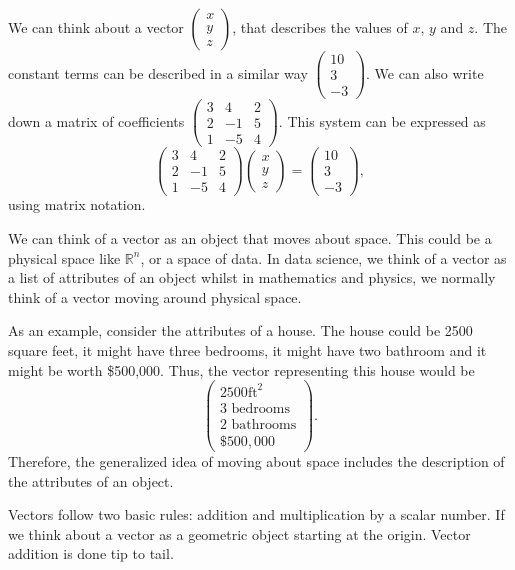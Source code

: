 \documentclass[
]{book}
\theoremstyle{definition}
\theoremstyle{definition}
\theoremstyle{definition}
\theoremstyle{definition}
\theoremstyle{remark}
\begin{document}
We can think about a vector \(\begin{pmatrix}x \\ y \\ z \end{pmatrix}\), that describes the values of \(x\), \(y\) and \(z\). The constant terms can be described in a similar way \(\begin{pmatrix}10 \\ 3 \\ -3 \end{pmatrix}\). We can also write down a matrix of coefficients \(\begin{pmatrix}3 & 4 & 2\\ 2 & -1 & 5\\ 1 & -5 & 4 \end{pmatrix}\). This system can be expressed as \[\begin{pmatrix}3 & 4 & 2\\ 2 & -1 & 5\\ 1 & -5 & 4 \end{pmatrix} \begin{pmatrix}x \\ y \\ z \end{pmatrix} = \begin{pmatrix}10 \\ 3 \\ -3 \end{pmatrix},\] using matrix notation.

We can think of a vector as an object that moves about space. This could be a physical space like \(\mathbb{R}^n\), or a space of data. In data science, we think of a vector as a list of attributes of an object whilst in mathematics and physics, we normally think of a vector moving around physical space.

As an example, consider the attributes of a house. The house could be 2500 square feet, it might have three bedrooms, it might have two bathroom and it might be worth \$500,000. Thus, the vector representing this house would be \[\begin{pmatrix} 2500 \text{ft}^2\\ 3\text{ bedrooms}\\ 2 \text{ bathrooms}\\ \$500,000 \end{pmatrix} .\]
Therefore, the generalized idea of moving about space includes the description of the attributes of an object.

Vectors follow two basic rules: addition and multiplication by a scalar number. If we think about a vector as a geometric object starting at the origin. Vector addition is done tip to tail.
\end{document}
